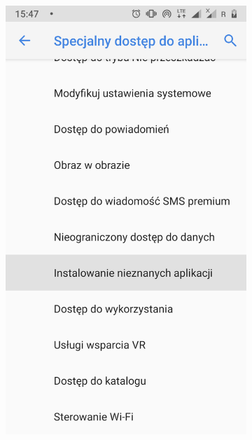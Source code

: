\begin{enumerate}
	
	\begin{figure}[H]
		\centering
		\begin{subfigure}{0.35\textwidth}
			\centering
			\includegraphics[scale=0.13]{dodatekA/1_3.png}
			\subcaption{\label{subfigure_a}}
		\end{subfigure}
		\begin{subfigure}{0.35\textwidth}
			\centering

\end{subfigure}
\end{figure}
\end{enumerate}
